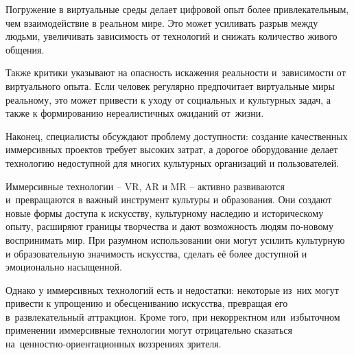 \documentclass{ou}
\begin{document}
Погружение в виртуальные среды делает цифровой опыт более привлекательным, чем взаимодействие в реальном мире. Это может усиливать разрыв между людьми, увеличивать зависимость от технологий и снижать количество живого общения.

Также критики указывают на опасность искажения реальности и~зависимости от виртуального опыта. Если человек регулярно предпочитает виртуальные миры реальному, это может привести к уходу от социальных и культурных задач, а также к формированию нереалистичных ожиданий от~жизни\cite{slater_enhancing_2016}.

Наконец, специалисты обсуждают проблему доступности: создание качественных иммерсивных проектов требует высоких затрат, а дорогое оборудование делает технологию недоступной для многих культурных организаций и пользователей.

Иммерсивные технологии -- VR, AR и MR -- активно развиваются и~превращаются в важный инструмент культуры и образования. Они создают новые формы доступа к искусству, культурному наследию и историческому опыту, расширяют границы творчества и дают возможность людям по-новому воспринимать мир. При разумном использовании они могут усилить культурную и образовательную значимость искусства, сделать её более доступной и эмоционально насыщенной.

Однако у иммерсивных технологий есть и недостатки: некоторые из~них могут привести к упрощению и обесцениванию искусства, превращая его в~развлекательный аттракцион. Кроме того, при некорректном или~избыточном применении иммерсивные технологии могут отрицательно сказаться на~ценностно-ориентационных воззрениях зрителя\cite{mironova_immersive_2023}.
\newpage
{
\sloppy
\nocite{*}
\cleardoublepage
{}


}
\end{document}

